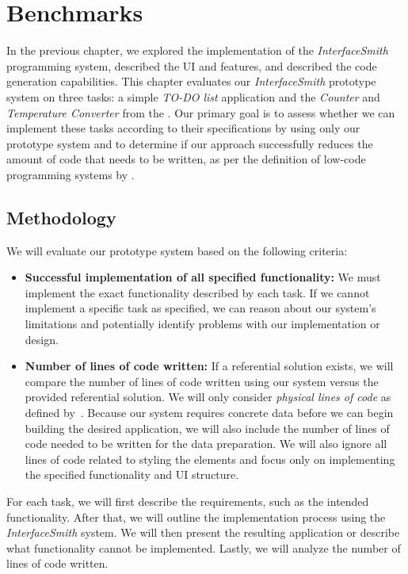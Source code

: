 \chapter{Benchmarks}
\label{chap:walktrough}

In the previous chapter, we explored the implementation of the \emph{InterfaceSmith} programming system, described the UI and features, and described the code generation capabilities.
This chapter evaluates our \emph{InterfaceSmith} prototype system on three tasks: a simple \emph{TO-DO list} application and the \emph{Counter} and \emph{Temperature Converter} from the \citet{7GUIs-web}.
Our primary goal is to assess whether we can implement these tasks according to their
specifications by using only our prototype system and to determine if our approach successfully
reduces the amount of code that needs to be written,
as per the definition of low-code programming systems by \citet{Pinho_Aguiar_Amaral_2023}.

\section{Methodology}
We will evaluate our prototype system based on the following criteria:
\begin{itemize}
	\item \textbf{Successful implementation of all specified functionality:}
	      We must implement the exact functionality described by each task.
	      If we cannot implement a specific task as specified, we can reason about our system's limitations and potentially
	      identify problems with our implementation or design.

	\item \textbf{Number of lines of code written:}
	      If a referential solution exists, we will compare the number of lines of code written using our system versus the provided referential solution.
	      We will only consider \emph{physical lines of code} as defined by~\citet{Park_1992}.
	      Because our system requires concrete data before we can begin building the desired application, we will also include the number of lines of code needed to be written for the data preparation.
	      We will also ignore all lines of code related to styling the elements and focus only on implementing the specified functionality and UI structure.
\end{itemize}

\noindent For each task, we will first describe the requirements, such as the intended functionality.
After that, we will outline the implementation process using the \emph{InterfaceSmith} system.
We will then present the resulting application or describe what functionality cannot be implemented.
Lastly, we will analyze the number of lines of code written.


